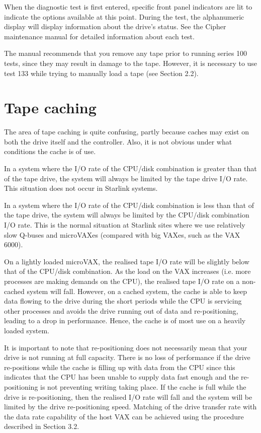 When the diagnostic test is first entered, specific front panel indicators
are lit to indicate the options available at this point. During the test, the
alphanumeric display will display information about the drive's status.
See the Cipher maintenance manual for detailed information about each test.

The manual recommends that you remove any tape prior to running series 100
tests, since they may result in damage to the tape. However, it is necessary
to use test 133 while trying to manually load a tape (see Section 2.2).


\section{Tape caching}

The area of tape caching is quite confusing, partly because caches may 
exist on both the drive itself and the controller. Also, it is not 
obvious under what conditions the cache is of use. 

In a system where the I/O rate of the CPU/disk combination is greater than 
that of the tape drive, the system will always be limited by the tape drive I/O
rate. This situation does not occur in Starlink systems.

In a system where the I/O rate of the CPU/disk combination is less than 
that of the tape drive, the system will always be limited by the CPU/disk
combination I/O rate. This is the normal situation at Starlink sites
where we use relatively slow Q-buses and microVAXes (compared with big
VAXes, such as the VAX 6000).

On a lightly loaded microVAX, the realised tape I/O rate will be slightly below that 
of the CPU/disk combination. As the load on the VAX increases (i.e. more 
processes are making demands on the CPU), the realised tape I/O rate on a non-cached
system will fall. However, on a cached system, the cache is able to keep 
data flowing to the drive during the short periods while the CPU is servicing
other processes and avoids the drive running out of data and re-positioning,
leading to a drop in performance.
Hence, the cache is of most use on a heavily loaded system.

It is important to note that re-positioning does not necessarily mean that 
your drive is not running at full capacity. There is no loss of performance if
the drive re-positions while the cache is filling up with data from the CPU
since this indicates that the CPU has been unable to supply data fast
enough and the re-positioning is not preventing writing taking place. If
the cache is full while the drive is re-positioning, then the realised I/O 
rate will fall and the system will be limited by the drive re-positioning
speed. Matching of the drive transfer rate with the data rate capability
of the host VAX can be achieved using the procedure described in Section 3.2.
 
